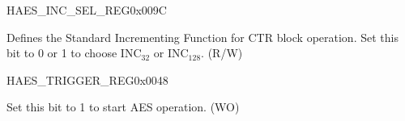 \begin{register}{H}{AES\_INC\_SEL\_REG}{0x009C}\label{regdesc:AESINCSELREG}
%
%
\regnewline%
\begin{regdesc}\begin{reglist}
\item [AES\_INC\_SEL] Defines the Standard Incrementing Function for CTR block operation. Set this bit to 0 or 1 to choose INC$_{32}$ or INC$_{128}$. (R/W)
\end{reglist}\end{regdesc}
\end{register}

\begin{register}{H}{AES\_TRIGGER\_REG}{0x0048}\label{regdesc:AESTRIGGERREG}
%
%
\regnewline%
\begin{regdesc}\begin{reglist}
\item [AES\_TRIGGER] Set this bit to 1 to start AES operation. (WO)
\end{reglist}\end{regdesc}
\end{register}


